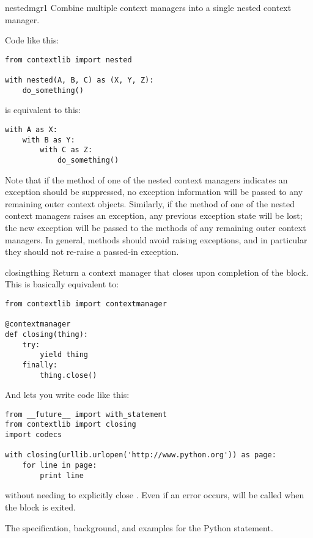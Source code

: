 \begin{funcdesc}{nested}{mgr1}
Combine multiple context managers into a single nested context manager.

Code like this:

\begin{verbatim}
from contextlib import nested

with nested(A, B, C) as (X, Y, Z):
    do_something()
\end{verbatim}

is equivalent to this:

\begin{verbatim}
with A as X:
    with B as Y:
        with C as Z:
            do_something()
\end{verbatim}

Note that if the  method of one of the nested
context managers indicates an exception should be suppressed, no
exception information will be passed to any remaining outer context
objects. Similarly, if the  method of one of the
nested context managers raises an exception, any previous exception
state will be lost; the new exception will be passed to the
 methods of any remaining outer context managers.
In general,  methods should avoid raising
exceptions, and in particular they should not re-raise a
passed-in exception.
\end{funcdesc}

\label{context-closing}
\begin{funcdesc}{closing}{thing}
Return a context manager that closes  upon completion of
the block.  This is basically equivalent to:

\begin{verbatim}
from contextlib import contextmanager

@contextmanager
def closing(thing):
    try:
        yield thing
    finally:
        thing.close()
\end{verbatim}

And lets you write code like this:
\begin{verbatim}
from __future__ import with_statement
from contextlib import closing
import codecs

with closing(urllib.urlopen('http://www.python.org')) as page:
    for line in page:
        print line
\end{verbatim}

without needing to explicitly close .  Even if an error
occurs,  will be called when the 
block is exited.
\end{funcdesc}

\begin{seealso}
         {The specification, background, and examples for the
          Python  statement.}
\end{seealso}
